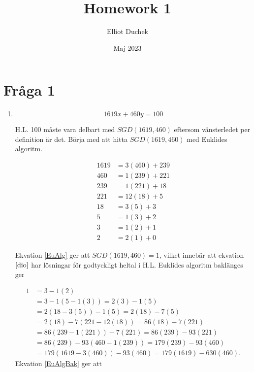 \documentclass{article}
\title{Homework 1}
\author{Elliot Duchek}
\date{Maj 2023}
\begin{document}
\maketitle

\section{Fråga 1}

\begin{enumerate}[label=(\alph*)]
	\item
		\begin{equation}
			\label{dio}
			1619x + 460y = 100
		\end{equation}

		H.L. 100 måste vara delbart med $SGD(1619, 460)$ eftersom vänsterledet per definition är det. Börja med att hitta $SGD(1619, 460)$ med Euklides algoritm.

		\begin{equation}
			\label{EuAlg}
			\begin{aligned}
				1619 &= 3 (460) + 239\\
				460 &= 1 (239) + 221\\
				239 &= 1 (221) + 18\\
				221 &= 12 (18) + 5\\
				18 &= 3 (5) + 3\\
				5 &= 1 (3) + 2\\
				3 &= 1 (2) + 1\\
				2 &= 2 (1) + 0
			\end{aligned}
		\end{equation}

		Ekvation \ref{EuAlg} ger att $SGD(1619, 460) = 1$, vilket innebär att ekvation $\ref{dio}$ har lösningar för godtyckligt heltal i  H.L. Euklides algoritm baklänges ger

		\begin{equation}
			\label{EuAlgBak}
			\begin{aligned}
				1 &= 3 - 1 (2)\\
				  &= 3 - 1 (5 - 1(3)) = 2(3) - 1(5)\\
				  &= 2(18 - 3(5)) - 1(5) = 2(18) - 7(5)\\
				  &= 2(18) - 7(221 - 12(18)) = 86(18) - 7(221)\\
				  &= 86(239 - 1(221)) - 7(221) = 86(239) - 93(221)\\
				  &= 86(239) - 93(460 - 1(239)) = 179(239) - 93(460)\\
				  &= 179(1619 - 3(460)) - 93(460) = 179(1619) - 630(460).
			\end{aligned}
		\end{equation}
		\newpage
		Ekvation \ref{EuAlgBak} ger att


\end{enumerate}
\end{document}
